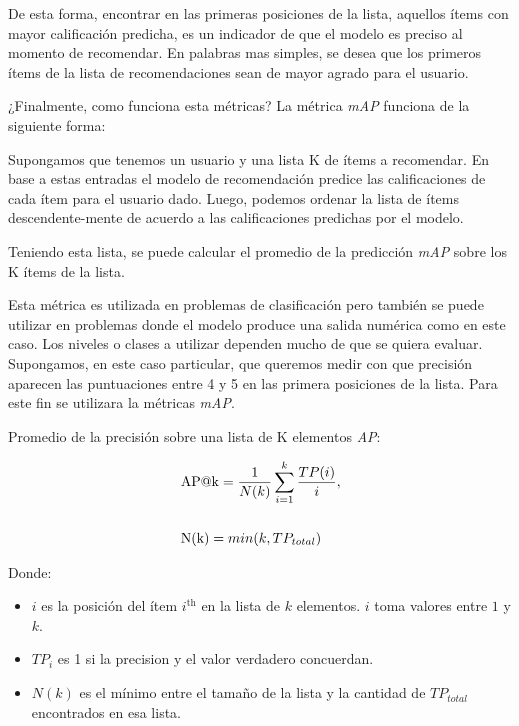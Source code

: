 \documentclass[11pt,a4paper,twoside]{thesis}
\begin{document}
De esta forma, encontrar en las primeras posiciones de la lista, aquellos ítems
con mayor calificación predicha, es un indicador de que el modelo es preciso al
momento de recomendar. En palabras mas simples, se desea que los primeros ítems
de la lista de recomendaciones sean de mayor agrado para el usuario.\newline

¿Finalmente, como funciona esta métricas? La métrica \textit{mAP\makeatletter@k} funciona de la siguiente forma: \newline

Supongamos que tenemos un usuario y una lista K de ítems a recomendar. En base
a estas entradas el modelo de recomendación predice las calificaciones de cada
ítem para el usuario dado. Luego, podemos ordenar la lista de ítems
descendente-mente de acuerdo a las calificaciones predichas por el modelo.

Teniendo esta lista, se puede calcular el promedio de la predicción
\textit{mAP\makeatletter@k} sobre los K ítems de la lista.

Esta métrica es utilizada en problemas de clasificación pero también se puede
utilizar en problemas donde el modelo produce una salida numérica como en este
caso. Los niveles o clases a utilizar dependen mucho de que se quiera evaluar.
Supongamos, en este caso particular, que queremos medir con que precisión
aparecen las puntuaciones entre 4 y 5 en las primera posiciones de la lista.
Para este fin se utilizara la métricas \textit{mAP\makeatletter@k}.

\begin{description}
	\item[Promedio de la precisión sobre una lista de K elementos
	\textit{AP\makeatletter@k}:]
\end{description}
\begin{equation}
	\begin{split}
		& \operatorname{AP\makeatletter@k}=\frac{1}{N(k)} \sum_{i=1}^k \frac{ TP(i)}{i}, \\
		& \\
		& \operatorname{N(k)} = min(k, TP_{total}) \\
	\end{split}
\end{equation}
\begin{description}
	\item[Donde:]
\end{description}
\begin{itemize}
	\item $i$ es la posición del ítem $i^\mathrm{th}$ en la lista de $k$ elementos. $i$  toma valores entre $1$ y $k$.
	\item $TP_i$ es 1 si la precision y el valor verdadero concuerdan.
	\item $N(k)$ es el mínimo entre el tamaño de la lista y la cantidad de $TP_{total}$ encontrados en esa lista.
\end{itemize}
\end{document}

